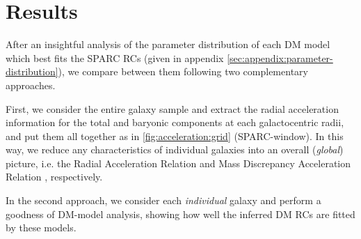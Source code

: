 
\section{Results}
\label{sec:results}

After an insightful analysis of the parameter distribution of each DM model which best fits the SPARC RCs (given in appendix \ref{sec:appendix:parameter-distribution}), we compare between them following two complementary approaches.

First, we consider the entire galaxy sample and extract the radial acceleration information for the total and baryonic components at each galactocentric radii, and put them all together as in \cref{fig:acceleration:grid} (SPARC-window). In this way, we reduce any characteristics of individual galaxies into an overall (\textit{global}) picture, i.e. the Radial Acceleration Relation \citep{2016PhRvL.117t1101M} and Mass Discrepancy Acceleration Relation \citep{2004ApJ...609..652M,2014Galax...2..601M}, respectively.

In the second approach, we consider each \textit{individual} galaxy and perform a goodness of DM-model analysis, showing how well the inferred DM RCs are fitted by these models.


